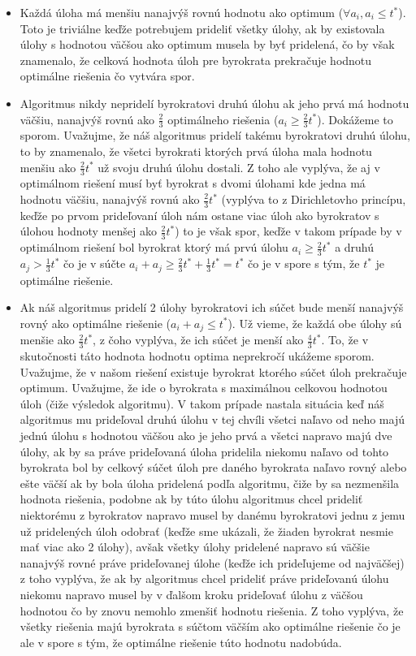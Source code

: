 \documentclass[a4paper]{article}
\begin{document}
\begin{itemize}
	\item Každá úloha má menšiu nanajvýš rovnú hodnotu ako optimum ($\forall a_i, a_i \leq t^*$). Toto je triviálne keďže potrebujem prideliť všetky úlohy, ak by existovala úlohy s hodnotou väčšou ako optimum musela by byť pridelená, čo by však znamenalo, že celková hodnota úloh pre byrokrata prekračuje hodnotu optimálne riešenia čo vytvára spor.
	
	\item Algoritmus nikdy nepridelí byrokratovi druhú úlohu ak jeho prvá má hodnotu väčšiu, nanajvýš rovnú ako $\frac{2}{3}$ optimálneho riešenia ($a_i \geq \frac{2}{3}t^*$). Dokážeme to sporom. Uvažujme, že náš algoritmus pridelí takému byrokratovi druhú úlohu, to by znamenalo, že všetci byrokrati ktorých prvá úloha mala hodnotu menšiu ako $\frac{2}{3}t^*$ už svoju druhú úlohu dostali. Z toho ale vyplýva, že aj v optimálnom riešení musí byť byrokrat s dvomi úlohami kde jedna má hodnotu väčšiu, nanajvýš rovnú ako $\frac{2}{3}t^*$ (vyplýva to z Dirichletovho princípu, keďže po prvom prideľovaní úloh nám ostane viac úloh ako byrokratov s úlohou hodnoty menšej ako $\frac{2}{3}t^*$) to je však spor, keďže v takom prípade by v optimálnom riešení bol byrokrat ktorý má prvú úlohu $a_i \geq \frac{2}{3}t^*$ a druhú $a_j > \frac{1}{3}t^*$ čo je v súčte $a_i + a_j \geq \frac{2}{3}t^* + \frac{1}{3}t^* = t^*$ čo je v spore s tým, že $t^*$ je optimálne riešenie.
	
	\item Ak náš algoritmus pridelí 2 úlohy byrokratovi ich súčet bude menší nanajvýš rovný ako optimálne riešenie ($a_i + a_j \leq t^*$).
	Už vieme, že každá obe úlohy sú menšie ako $\frac{2}{3}t^*$, z čoho vyplýva, že ich súčet je menší ako  $\frac{4}{3}t^*$. To, že v skutočnosti táto hodnota hodnotu optima neprekročí ukážeme sporom. Uvažujme, že v našom riešení existuje byrokrat ktorého súčet úloh prekračuje optimum. Uvažujme, že ide o byrokrata s maximálnou celkovou hodnotou úloh (čiže výsledok algoritmu). V takom prípade nastala situácia keď náš algoritmus mu prideľoval druhú úlohu v tej chvíli všetci naľavo od neho majú jednú úlohu s hodnotou väčšou ako je jeho prvá a všetci napravo majú dve úlohy, ak by sa práve prideľovaná úloha pridelila niekomu naľavo od tohto byrokrata bol by celkový súčet úloh pre daného byrokrata naľavo rovný alebo ešte väčší ak by bola úloha pridelená podľa algoritmu, čiže by sa nezmenšila hodnota riešenia, podobne ak by túto úlohu algoritmus chcel prideliť niektorému z byrokratov napravo musel by danému byrokratovi jednu z jemu už pridelených úloh odobrať (keďže sme ukázali, že žiaden byrokrat nesmie mať viac ako 2 úlohy), avšak všetky úlohy pridelené napravo sú väčšie nanajvýš rovné práve prideľovanej úlohe (keďže ich prideľujeme od najväčšej) z toho vyplýva, že ak by algoritmus chcel prideliť práve prideľovanú úlohu niekomu napravo musel by v ďalšom kroku prideľovať úlohu z väčšou hodnotou čo by znovu nemohlo zmenšiť hodnotu riešenia. Z toho vyplýva, že všetky riešenia majú byrokrata s súčtom väčším ako optimálne riešenie čo je ale v spore s tým, že optimálne riešenie túto hodnotu nadobúda.  
\end{itemize}
\end{document}
